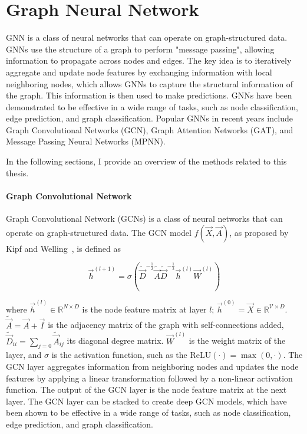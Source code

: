 \section{Graph Neural Network}
GNN is a class of neural networks that can operate on graph-structured data. GNNs use the structure of a graph to perform "message passing", allowing information to propagate across nodes and edges. The key idea is to iteratively aggregate and update node features by exchanging information with local neighboring nodes, which allows GNNs to capture the structural information of the graph. This information is then used to make predictions. GNNs have been demonstrated to be effective in a wide range of tasks, such as node classification, edge prediction, and graph classification. Popular GNNs in recent years include Graph Convolutional Networks (GCN), Graph Attention Networks (GAT), and Message Passing Neural Networks (MPNN).

In the following sections, I provide an overview of the methods related to this thesis.

\paragraph{Graph Convolutional Network}

Graph Convolutional Network (GCNs) is a class of neural networks that can operate on graph-structured data. The GCN model $f(\vec{X}, \vec{A})$, as proposed by Kipf and Welling~\cite{kipf2016semi}, is defined as

$$ 
 \vec{h}^{(l+1)} = \sigma(\tilde{\vec{D}}^{-\frac{1}{2}}\tilde{\vec{A}}\tilde{\vec{D}}^{-\frac{1}{2}}\vec{h}^{(l)}\vec{W}^{(l)})
$$

where $\vec{h}^{(l)}\in \mathbb{R}^{N\times D}$ is the node feature matrix at layer $l$; $\vec{h}^{(0)} = \vec{X} \in \mathbb{R}^{\mathcal{V}\times D}$. $\tilde{\vec{A}} = \vec{A} + \vec{I}$ is the adjacency matrix of the graph with self-connections added, $\tilde{\vec{D}}_{ii}=\sum_{j=0} \tilde{\vec{A}}_{ij}$ its diagonal degree matrix. $\vec{W}^{(l)}$ is the weight matrix of the layer, and $\sigma$ is the activation function, such as the $\textrm{ReLU}(\cdot)=\max(0,\cdot)$. The GCN layer aggregates information from neighboring nodes and updates the node features by applying a linear transformation followed by a non-linear activation function. The output of the GCN layer is the node feature matrix at the next layer. The GCN layer can be stacked to create deep GCN models, which have been shown to be effective in a wide range of tasks, such as node classification, edge prediction, and graph classification.


